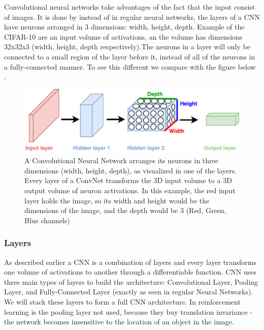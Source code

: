 Convolutional neural networks take advantages of the fact that the input consist of images. It is done by instead of in regular neural networks, the layers of a CNN have neurons arranged in 3 dimensions: width, height, depth. Example of the CIFAR-10 are an input volume of activations, an the volume has dimensions 32x32x3 (width, height, depth respectively).The neurons in a layer will only be connected to a small region of the layer before it, instead of all of the neurons in a fully-connected manner. To see this different we compare  with the figure below .  

\begin{figure}[H]
	\centering
	\includegraphics[width=1\textwidth]{Figures/NN_vs_CNN.pdf}
	\caption{A Convolutional Neural Network arranges its neurons in three dimensions (width, height, depth), as visualized in one of the layers. Every layer of a ConvNet transforms the 3D input volume to a 3D output volume of neuron activations. In this example, the red input layer holds the image, so its width and height would be the dimensions of the image, and the depth would be 3 (Red, Green, Blue channels) \cite{CNN_course}}
	\label{fig:NN_vs_CNN}
\end{figure}

\subsubsection{Layers}
As described earlier a CNN is a combination of layers and every layer transforms one volume of activations to another  through a differentiable function. CNN uses three main types of layers to build the architecture: Convolutional Layer, Pooling Layer, and Fully-Connected Layer (exactly as seen in regular Neural Networks). We will stack these layers to form a full CNN architecture. In reinforcement learning is the pooling layer not used, because they buy translation invariance - the network becomes insensitive to the location of an object in the image.

